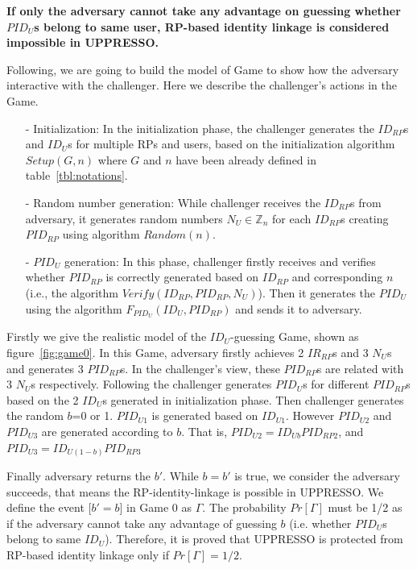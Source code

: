 \textbf{If only the adversary cannot take any advantage on guessing whether $PID_U$s belong to same user, RP-based identity linkage is considered impossible in UPPRESSO.}


Following, we are going to build the model of Game to show how the adversary interactive with the challenger. Here we describe the challenger's actions in the Game.
\begin{itemize}
\item[-] Initialization: In the initialization phase, the challenger generates the $ID_{RP}$s and $ID_U$s for multiple RPs and users, based on the initialization algorithm $Setup(G,n)$ where $G$ and $n$ have been already defined in table~\ref{tbl:notations}.
\item[-] Random number generation: While challenger receives the $ID_{RP}$s from adversary, it generates random numbers $N_U \in \mathbb{Z}_n$ for each $ID_{RP}$s creating $PID_{RP}$ using algorithm $Random(n)$.
\item[-] $PID_U$ generation: In this phase, challenger firstly receives and  verifies whether $PID_{RP}$ is correctly generated based on $ID_{RP}$ and corresponding $n$ (i.e., the algorithm $Verify(ID_{RP},PID_{RP},N_U)$). Then it generates the $PID_U$ using the algorithm $F_{PID_U}(ID_U,PID_{RP})$ and sends it to adversary.
\end{itemize}

Firstly we give the realistic model of the $ID_U$-guessing Game, shown as figure~\ref{fig:game0}. In this Game, adversary firstly achieves 2 $IR_{RP}$s and 3 $N_U$s and generates 3 $PID_{RP}$s. In the challenger's view, these $PID_{RP}$s are related with 3 $N_U$s respectively. Following the challenger generates $PID_U$s for different $PID_{RP}$s based on the 2 $ID_U$s generated in initialization phase. 
Then challenger generates the random $b$=0 or 1. $PID_{U1}$ is generated based on $ID_{U1}$. However $PID_{U2}$ and $PID_{U3}$ are generated according to $b$. That is, $PID_{U2}=ID_{Ub}PID_{RP2}$, and $PID_{U3}=ID_{U(1-b)}PID_{RP3}$  

Finally adversary returns the $b'$. While $b=b'$ is true, we consider the adversary succeeds, that means the RP-identity-linkage is possible in UPPRESSO.
We define the event [$b'=b$] in Game 0 as $\Gamma$. The probability $Pr[\Gamma]$ must be 1/2 as if the adversary cannot take any advantage of guessing $b$ (i.e.  whether $PID_U$s belong to same $ID_U$). Therefore, it is proved that UPPRESSO is protected from RP-based identity linkage only if $Pr[\Gamma]=1/2$.

